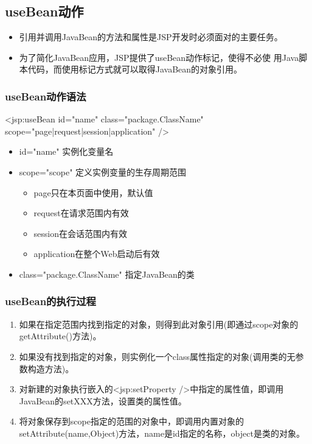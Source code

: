 \subsection{useBean动作} 
\begin{itemize}
\item 引用并调用JavaBean的方法和属性是JSP开发时必须面对的主要任务。
\item 为了简化JavaBean应用，JSP提供了useBean动作标记，使得不必使
  用Java脚本代码，而使用标记方式就可以取得JavaBean的对象引用。
\end{itemize}
  
\subsubsection{useBean动作语法}

\begin{jspCode}
  <jsp:useBean id="name" class="package.ClassName" 
    scope="page|request|session|application" />
\end{jspCode}

\begin{itemize}
\item id="name" 实例化变量名
\item scope="scope" 定义实例变量的生存周期范围
  \begin{itemize}\kai\small
  \item page只在本页面中使用，默认值
  \item request在请求范围内有效
  \item session在会话范围内有效
  \item application在整个Web启动后有效
  \end{itemize}
\item class="package.ClassName" 指定JavaBean的类
\end{itemize}

\subsubsection{useBean的执行过程}

\begin{enumerate}\kai
\item 如果在指定范围内找到指定的对象，则得到此对象引用(即通过scope对象的getAttribute()方法)。
\item 如果没有找到指定的对象，则实例化一个class属性指定的对象(调用类的无参数构造方法)。
\item 对新建的对象执行嵌入的<jsp:setProperty />中指定的属性值，即调用JavaBean的setXXX方法，设置类的属性值。
\item 将对象保存到scope指定的范围的对象中，即调用内置对象的setAttribute(name,Object)方法，name是id指定的名称，object是类的对象。
\end{enumerate}

